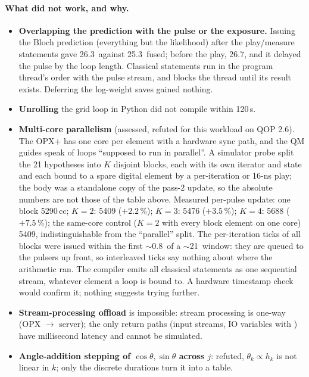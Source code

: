 \paragraph{What did not work, and why.}
\begin{itemize}[nosep]
  \item \textbf{Overlapping the prediction with the pulse or the exposure.}
    Issuing the Bloch prediction (everything but the likelihood) after the
    play/measure statements gave 26.3\us\ against 25.3\us\ fused; before the
    play, 26.7\us, and it delayed the pulse by the loop length. Classical
    statements run in the program thread's order with the pulse stream, and
     blocks the thread until its result exists. Deferring the
    log-weight saves gained nothing.
  \item \textbf{Unrolling} the grid loop in Python did not compile within
    120\,s.
  \item \textbf{Multi-core parallelism} (assessed, refuted for this workload
    on QOP 2.6). The OPX+ has one core per element with a hardware sync path,
    and the QM guides speak of loops ``supposed to run in parallel''. A
    simulator probe split the 21 hypotheses into $K$ disjoint blocks, each
    with its own iterator and state and each bound to a spare digital element
    by a per-iteration  or 16-ns play; the body was a standalone
    copy of the pass-2 update, so the absolute numbers are not those of the
    table above. Measured per-pulse update:
    one block 5290\,cc; $K = 2$: 5409 ($+2.2$\,\%); $K = 3$: 5476 ($+3.5$\,\%);
    $K = 4$: 5688 ($+7.5$\,\%); the same-core control ($K = 2$ with every block
    element on one core) 5409, indistinguishable from the ``parallel'' split.
    The per-iteration ticks of all blocks were issued within the first
    $\sim$0.8\us\ of a $\sim$21\us\ window: they are queued to the pulsers up
    front, so interleaved ticks say nothing about where the arithmetic ran.
    The compiler emits all classical statements as one sequential stream,
    whatever element a loop is bound to. A hardware timestamp check would
    confirm it; nothing suggests trying further.
  \item \textbf{Stream-processing offload} is impossible: stream processing
    is one-way (OPX $\to$ server); the only return paths (input streams, IO
    variables with ) have millisecond latency and cannot be
    simulated.
  \item \textbf{Angle-addition stepping of $\cos\theta, \sin\theta$ across $j$}:
    refuted, $\theta_k \propto h_k$ is not linear in $k$; only the discrete
    durations turn it into a table.
\end{itemize}

